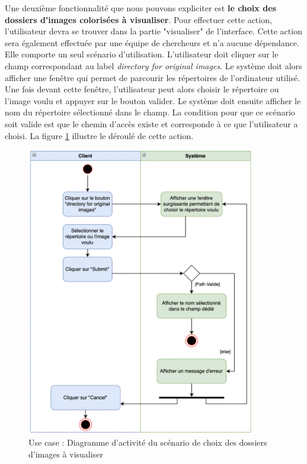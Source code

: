 \documentclass{article}
\begin{document}
Une deuxième fonctionnalité que nous pouvons expliciter est \textbf{le choix des dossiers d'images colorisées à visualiser}.
Pour effectuer cette action, l'utilisateur devra se trouver dans la partie "visualiser" de l'interface.
Cette action sera également effectuée par une équipe de chercheurs et n'a aucune dépendance. Elle comporte un seul scénario 
d'utilisation. L'utilisateur doit cliquer sur le champ correspondant au label \textit{directory for original images}. Le système
doit alors afficher une fenêtre qui permet de parcourir les répertoires de l'ordinateur utilisé. Une fois devant cette fenêtre, l'utilisateur
peut alors choisir le répertoire ou l'image voulu et appuyer sur le bouton valider. Le système doit ensuite afficher le nom du répertoire 
sélectionné dans le champ. La condition pour que ce scénario soit valide est que le chemin d'accès existe et corresponde à ce que l'utilisateur a choisi.
La figure \ref{fig:scenario-choix-images-visualiser} illustre le déroulé de cette action.\\

\begin{figure}[htp]
    \centering
    \includegraphics[width=10cm]{scenario-choix-images-visualiser.png}
    \caption{Use case : Diagramme d'activité du scénario de choix des dossiers d'images à visualiser}
    \label{fig:scenario-choix-images-visualiser}
\end{figure}
\end{document}

